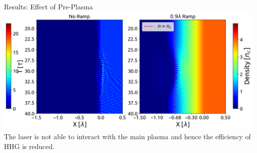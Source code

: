 \documentclass{beamer}
\begin{document}
\begin{frame}{Results: Effect of  Pre-Plasma}
    \centering
    \includegraphics[width=1\textwidth]{images/ramp_d_2.png}
    \scriptsize{The laser is not able to interact with the main plasma and hence the efficiency of HHG is reduced.}
    \label{fig:ramp-density}
\end{frame}
\end{document}
